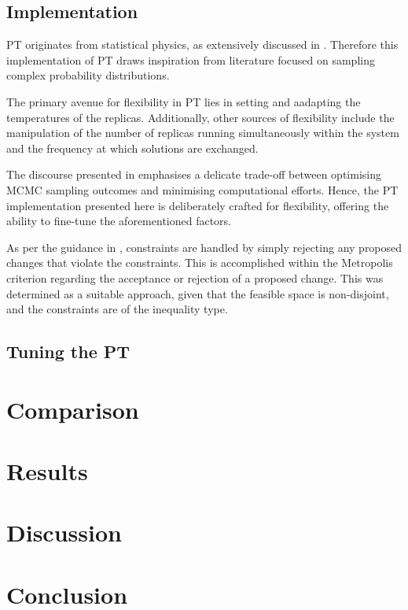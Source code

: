 \documentclass[10pt]{article}
\begin{document}
\begin{multicols}{2}
\subsection{Implementation}

PT originates from statistical physics, as extensively discussed in \cite{Earl_2005}. Therefore this implementation of PT draws inspiration from literature focused on sampling complex probability distributions. 

The primary avenue for flexibility in PT lies in setting and aadapting the temperatures of the replicas. Additionally, other sources of flexibility include the manipulation of the number of replicas running simultaneously within the system and the frequency at which solutions are exchanged.

The discourse presented in \cite{Earl_2005} emphasises a delicate trade-off between optimising MCMC sampling outcomes and minimising computational efforts. Hence, the PT implementation presented here is deliberately crafted for flexibility, offering the ability to fine-tune the aforementioned factors. 

As per the guidance in \cite{parks2023geneticalgorithmsSA}, constraints are handled by simply rejecting any proposed changes that violate the constraints. This is accomplished within the Metropolis criterion regarding the acceptance or rejection of a proposed change. This was determined as a suitable approach, given that the feasible space is non-disjoint, and the constraints are of the inequality type.

\subsection{Tuning the PT}


\end{multicols}
\section{Comparison}
\label{sec:CGA_QEG_comparison}
\section{Results}
\section{Discussion}
\section{Conclusion}

\newpage
\end{document}
